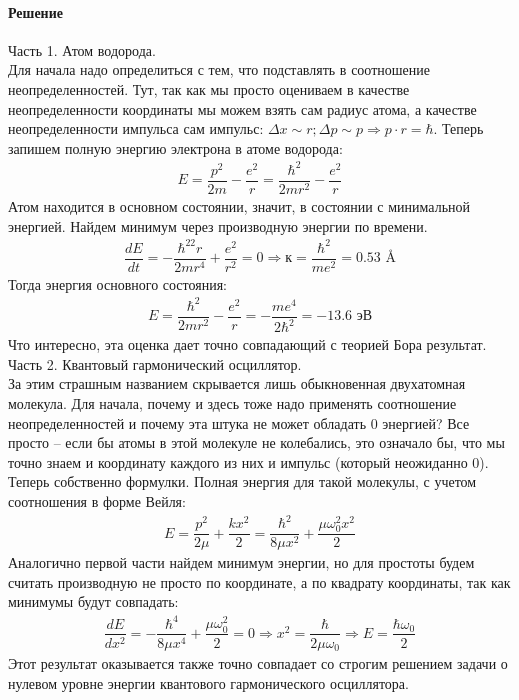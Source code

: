\documentclass[12pt]{article}
\begin{document}
\paragraph{Решение}
Часть 1. Атом водорода.\\
Для начала надо определиться с тем, что подставлять в соотношение неопределенностей. Тут, так как мы просто оцениваем в качестве неопределенности координаты мы можем взять сам радиус атома, а качестве неопределенности импульса сам импульс: $\Delta x \sim r; \Delta p \sim p \Rightarrow p\cdot r = \hbar $. Теперь запишем полную энергию электрона в атоме водорода:
\begin{gather*}
    E = \dfrac{p^2}{2m} - \dfrac{e^2}{r} = \dfrac{\hbar^2}{2mr^2} - \dfrac{e^2}{r}
\end{gather*}
Атом находится в основном состоянии, значит, в состоянии с минимальной энергией. Найдем минимум через производную энергии по времени. 
\begin{gather*}
    \dfrac{dE}{dt} = -\dfrac{\hbar^22r}{2mr^4} + \dfrac{e^2}{r^2} = 0 \Rightarrow к = \dfrac{\hbar^2}{me^2}=0.53 \text{ \AA}
\end{gather*}
Тогда энергия основного состояния:
\begin{gather*}
     E = \dfrac{\hbar^2}{2mr^2} - \dfrac{e^2}{r} = -\dfrac{me^4}{2\hbar^2} = -13.6\text{ эВ}
\end{gather*}
Что интересно, эта оценка дает точно совпадающий с теорией Бора результат.\\
Часть 2. Квантовый гармонический осциллятор.\\
За этим страшным названием скрывается лишь обыкновенная двухатомная молекула. Для начала, почему и здесь тоже надо применять соотношение неопределенностей и почему эта штука не может обладать 0 энергией? Все просто -- если бы атомы в этой молекуле не колебались, это означало бы, что мы точно знаем и координату каждого из них и импульс (который неожиданно 0). Теперь собственно формулки. Полная энергия для такой молекулы, с учетом соотношения в форме Вейля:
\begin{gather*}
     E = \dfrac{p^2}{2\mu} + \dfrac{kx^2}{2} = \dfrac{\hbar^2}{8\mu x^2} + \dfrac{\mu \omega_0^2 x^2}{2}
\end{gather*}
Аналогично первой части найдем минимум энергии, но для простоты будем считать производную не просто по координате, а по квадрату координаты, так как минимумы будут совпадать:
\begin{gather*}
    \dfrac{dE}{dx^2} = -\dfrac{\hbar^4}{8\mu x^4} + \dfrac{\mu \omega_0^2}{2} = 0 \Rightarrow x^2 = \dfrac{\hbar}{2\mu\omega_0} \Rightarrow E = \dfrac{\hbar\omega_0}{2}
\end{gather*}
Этот результат оказывается также точно совпадает со строгим решением задачи о нулевом уровне энергии квантового гармонического осциллятора.
\end{document}
